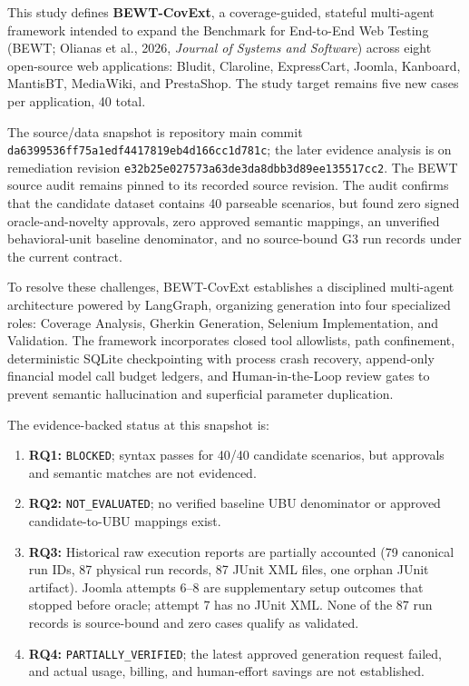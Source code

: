 \documentclass[pdflatex,sn-mathphys-num]{sn-jnl}
\begin{document}
This study defines \textbf{BEWT-CovExt}, a coverage-guided, stateful multi-agent framework intended to expand the Benchmark for End-to-End Web Testing (BEWT; Olianas et al., 2026, \textit{Journal of Systems and Software}) across eight open-source web applications: Bludit, Claroline, ExpressCart, Joomla, Kanboard, MantisBT, MediaWiki, and PrestaShop. The study target remains five new cases per application, 40 total.

The source/data snapshot is repository main commit \texttt{da6399536ff75a1edf4417819eb4d166cc1d781c}; the later evidence analysis is on remediation revision \texttt{e32b25e027573a63de3da8dbb3d89ee135517cc2}. The BEWT source audit remains pinned to its recorded source revision. The audit confirms that the candidate dataset contains 40 parseable scenarios, but found zero signed oracle-and-novelty approvals, zero approved semantic mappings, an unverified behavioral-unit baseline denominator, and no source-bound G3 run records under the current contract.

To resolve these challenges, BEWT-CovExt establishes a disciplined multi-agent architecture powered by LangGraph, organizing generation into four specialized roles: Coverage Analysis, Gherkin Generation, Selenium Implementation, and Validation. The framework incorporates closed tool allowlists, path confinement, deterministic SQLite checkpointing with process crash recovery, append-only financial model call budget ledgers, and Human-in-the-Loop review gates to prevent semantic hallucination and superficial parameter duplication.

The evidence-backed status at this snapshot is:
\begin{enumerate}
    \item \textbf{RQ1:} \texttt{BLOCKED}; syntax passes for 40/40 candidate scenarios, but approvals and semantic matches are not evidenced.
    \item \textbf{RQ2:} \texttt{NOT\_EVALUATED}; no verified baseline UBU denominator or approved candidate-to-UBU mappings exist.
    \item \textbf{RQ3:} Historical raw execution reports are partially accounted (79 canonical run IDs, 87 physical run records, 87 JUnit XML files, one orphan JUnit artifact). Joomla attempts 6–8 are supplementary setup outcomes that stopped before oracle; attempt 7 has no JUnit XML. None of the 87 run records is source-bound and zero cases qualify as validated.
    \item \textbf{RQ4:} \texttt{PARTIALLY\_VERIFIED}; the latest approved generation request failed, and actual usage, billing, and human-effort savings are not established.
\end{enumerate}
\end{document}
